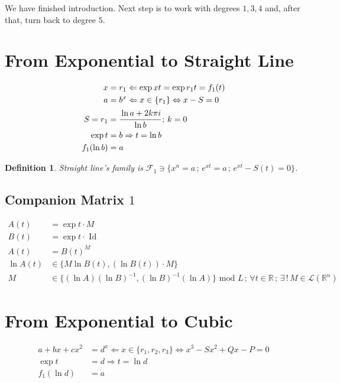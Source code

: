 \documentclass[12pt,a4paper]{article}
\newtheorem{definition}{Definition}[section]
\begin{document}
We have finished introduction. Next step is to work with degrees $1, 3, 4$ and, after that, turn back to degree $5$.

\section{From Exponential to Straight Line}

\begin{align}
x &= r_1 \Leftarrow \exp xt = \exp r_1 t = f_1(t) \\
a &= b^x \Leftarrow x \in \{ r_1 \} \Leftrightarrow x - S = 0 \\
S = r_1 &= \cfrac{\ln a + 2k\pi i}{\ln b}\,;\,k = 0 \\
\exp t &= b \Rightarrow t = \ln b \\
f_1(\ln b) &= a
\end{align}

\begin{definition}
Straight line's family is $\mathcal{F}_1 \ni \{ x^n = a\,;\,e^{xt} = a\,;\,e^{xt} - S(t) = 0 \}$.
\end{definition}

\subsection{Companion Matrix $1$}

\begin{align}
A(t) &= \exp t\cdot M \\
B(t) &= \exp t\cdot \text{ Id} \\
A(t) &= B(t)^M \\
\ln A(t) &\in \{ M \ln B(t), (\ln B(t))\cdot M \} \\
M &\in \{ (\ln A)(\ln B)^{-1}, (\ln B)^{-1}(\ln A) \} \text{ mod } L\,;\,\forall t \in \mathbb{R}\,;\,\exists\,!\,M \in \mathcal{L}(\mathbb{R}^n)
\end{align}

\section{From Exponential to Cubic}

\begin{align}
a + bx + cx^2 &= d^x \Leftarrow x \in \{ r_1, r_2, r_3 \} \Leftrightarrow x^3 - Sx^2 + Qx - P = 0 \\
\exp t &= d \Rightarrow t = \ln d \\
f_1(\ln d) &= a
\end{align}
\end{document}

